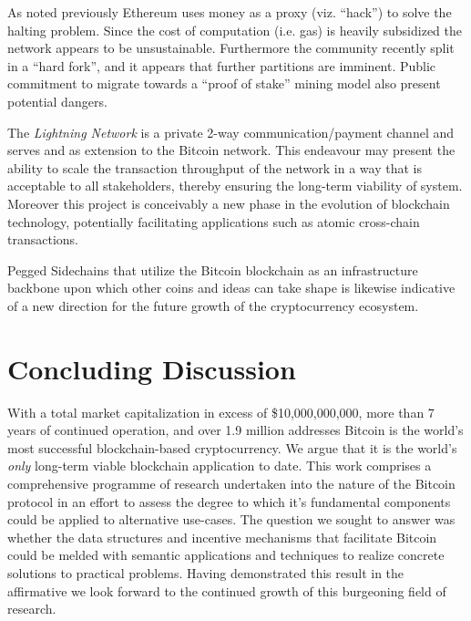As noted previously Ethereum uses money as a proxy (viz. ``hack'') to solve the halting problem.
Since the cost of computation (i.e. gas) is heavily subsidized the network appears to be unsustainable.
Furthermore the community recently split in a ``hard fork'', and it appears that further partitions are imminent. 
Public commitment to migrate towards a ``proof of stake'' mining model also present potential dangers. 

The \textit{Lightning Network} is a private 2-way communication/payment channel and serves and as extension to the Bitcoin network.
This endeavour may present the ability to scale the transaction throughput of the network in a way that is acceptable to all stakeholders, thereby ensuring the long-term viability of system. 
Moreover this project is conceivably a new phase in the evolution of blockchain technology, potentially facilitating applications such as atomic cross-chain transactions.

Pegged Sidechains that utilize the Bitcoin blockchain as an infrastructure backbone upon which other coins and ideas can take shape is likewise indicative of a new direction for the future growth of the cryptocurrency ecosystem. 

\section{Concluding Discussion\label{sec:dissemination}}

With a total market capitalization in excess of \$10,000,000,000, more than 7 years of continued operation, and over 1.9 million addresses Bitcoin is the world's most successful blockchain-based cryptocurrency. 
We argue that it is the world’s \textit{only} long-term viable blockchain application to date. 
This work comprises a comprehensive programme of research undertaken into the nature of the Bitcoin protocol in an effort to assess the degree to which it's fundamental components could be applied to alternative use-cases.
The question we sought to answer was whether the data structures and incentive mechanisms that facilitate Bitcoin could be melded with semantic applications and techniques to realize concrete solutions to practical problems.
Having demonstrated this result in the affirmative we look forward to the continued growth of this burgeoning field of research. 